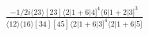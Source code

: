 \documentclass[varwidth, border=5pt]{standalone}
\begin{document}
\begin{my}
$\begin{gathered}
\scriptscriptstyle\frac{-1/2i\langle23\rangle[23]\langle2|1+6|4]^4\langle6|1+2|3]^3}{\langle12\rangle\langle16\rangle[34][45]\langle2|1+6|3]^4\langle2|1+6|5]}
\end{gathered}$
\end{my}
\end{document}
